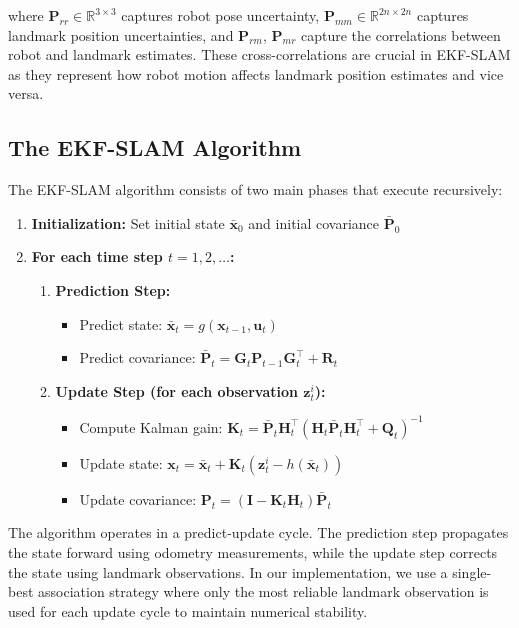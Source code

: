 \documentclass[12pt,a4paper]{article}
\newcommand{\state}{\bm{x}}
\newcommand{\measurement}{\bm{z}}
\newcommand{\control}{\bm{u}}
\newcommand{\covariance}{\bm{P}}
\newcommand{\kalman}{\bm{K}}
\newcommand{\noise}{\bm{Q}}
\begin{document}
where $\covariance_{rr} \in \mathbb{R}^{3\times 3}$ captures robot pose uncertainty, $\covariance_{mm} \in \mathbb{R}^{2n\times 2n}$ captures landmark position uncertainties, and $\covariance_{rm}$, $\covariance_{mr}$ capture the correlations between robot and landmark estimates. These cross-correlations are crucial in EKF-SLAM as they represent how robot motion affects landmark position estimates and vice versa.

\subsection{The EKF-SLAM Algorithm}

The EKF-SLAM algorithm consists of two main phases that execute recursively:

\begin{enumerate}
    \item \textbf{Initialization:} Set initial state $\bar{\state}_0$ and initial covariance $\bar{\covariance}_0$
    \item \textbf{For each time step $t = 1, 2, \ldots$:}
    \begin{enumerate}
        \item \textbf{Prediction Step:}
        \begin{itemize}
            \item Predict state: $\bar{\state}_t = g(\state_{t-1}, \control_t)$
            \item Predict covariance: $\bar{\covariance}_t = \bm{G}_t \covariance_{t-1} \bm{G}_t^\top + \bm{R}_t$
        \end{itemize}
        \item \textbf{Update Step (for each observation $\measurement_t^i$):}
        \begin{itemize}
            \item Compute Kalman gain: $\kalman_t = \bar{\covariance}_t \bm{H}_t^\top (\bm{H}_t \bar{\covariance}_t \bm{H}_t^\top + \noise_t)^{-1}$
            \item Update state: $\state_t = \bar{\state}_t + \kalman_t (\measurement_t^i - h(\bar{\state}_t))$
            \item Update covariance: $\covariance_t = (\bm{I} - \kalman_t \bm{H}_t) \bar{\covariance}_t$
        \end{itemize}
    \end{enumerate}
\end{enumerate}

The algorithm operates in a predict-update cycle. The prediction step propagates the state forward using odometry measurements, while the update step corrects the state using landmark observations. In our implementation, we use a single-best association strategy where only the most reliable landmark observation is used for each update cycle to maintain numerical stability.
\end{document}
